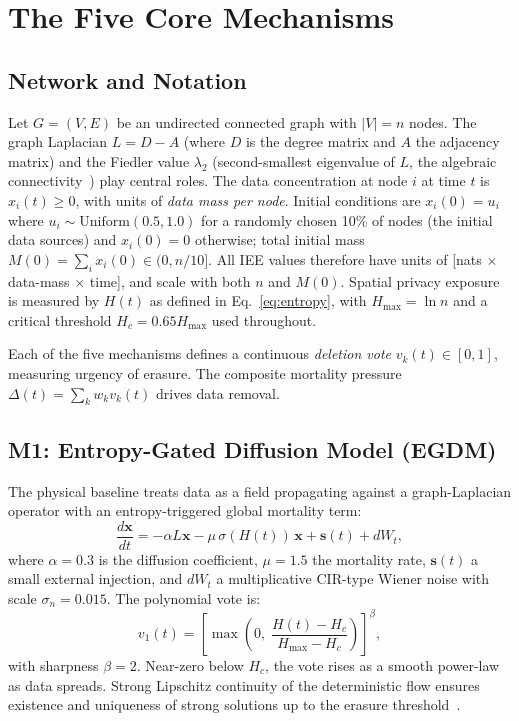 \documentclass[review,12pt]{elsarticle}
\newcommand{\bfx}{\mathbf{x}}
\newcommand{\Hc}{H_c}
\newcommand{\Hmax}{H_{\max}}
\newcommand{\lambdat}{\lambda_2}
\begin{document}
\section{The Five Core Mechanisms}
\label{sec:mechanisms}

\subsection{Network and Notation}

Let $G = (V, E)$ be an undirected connected graph with $|V| = n$ nodes. The
graph Laplacian $L = D - A$ (where $D$ is the degree matrix and $A$ the
adjacency matrix) and the Fiedler value $\lambdat$ (second-smallest eigenvalue
of $L$, the algebraic connectivity~\cite{chung1997spectral}) play central roles.
The data concentration at node $i$ at time $t$ is $x_i(t) \geq 0$, with units
of \emph{data mass per node}.  Initial conditions are $x_i(0) = u_i$ where
$u_i \sim \mathrm{Uniform}(0.5, 1.0)$ for a randomly chosen 10\% of nodes
(the initial data sources) and $x_i(0) = 0$ otherwise; total initial mass
$M(0) = \sum_i x_i(0) \in (0, n/10]$.  All IEE values therefore have units
of [nats $\times$ data-mass $\times$ time], and scale with both $n$ and $M(0)$.
Spatial privacy exposure is measured by $H(t)$ as defined in Eq.~\eqref{eq:entropy},
with $\Hmax = \ln n$ and a critical threshold $\Hc = 0.65 \Hmax$ used throughout.

Each of the five mechanisms defines a continuous \emph{deletion vote}
$v_k(t) \in [0,1]$, measuring urgency of erasure. The composite mortality
pressure $\Delta(t) = \sum_k w_k v_k(t)$ drives data removal.

\subsection{M1: Entropy-Gated Diffusion Model (EGDM)}

The physical baseline treats data as a field propagating against a
graph-Laplacian operator with an entropy-triggered global mortality term:
\begin{equation}
  \frac{d\bfx}{dt} = -\alpha L\bfx - \mu\,\sigma(H(t))\,\bfx
                     + \mathbf{s}(t) + dW_t,
  \label{eq:egdm}
\end{equation}
where $\alpha = 0.3$ is the diffusion coefficient, $\mu = 1.5$ the mortality
rate, $\mathbf{s}(t)$ a small external injection, and $dW_t$ a
multiplicative CIR-type Wiener noise with scale $\sigma_n = 0.015$.
The polynomial vote is:
\begin{equation}
  v_1(t) = \left[\max\!\left(0,\;\frac{H(t) - \Hc}{\Hmax - \Hc}\right)\right]^{\!\beta},
  \label{eq:v1}
\end{equation}
with sharpness $\beta = 2$. Near-zero below $\Hc$, the vote rises as a
smooth power-law as data spreads. Strong Lipschitz continuity of the
deterministic flow ensures existence and uniqueness of strong solutions
up to the erasure threshold~\cite{oksendal2003stochastic}.
\end{document}
